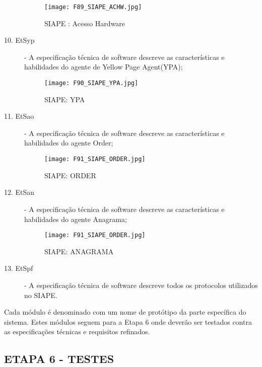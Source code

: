 \begin{description}
		 \begin{figure}[!h]
		 	\centering
		 	\texttt{[image: F89\_SIAPE\_ACHW.jpg]} 
		 	\caption{SIAPE : Acesso Hardware}
		 	\label{F89}
		 \end{figure}
		
		\item[10. EtSyp] - A especificação técnica de software descreve as características e habilidades do agente de Yellow Page Agent(YPA);
		
		 \begin{figure}[!h]
		 	\centering
		 	\texttt{[image: F90\_SIAPE\_YPA.jpg]} 
		 	\caption{SIAPE: YPA}
		 	\label{F90}
		 \end{figure}	
				
		\item[11. EtSao] - A especificação técnica de software descreve as características e habilidades do agente Order;
				
		 \begin{figure}[!h]
		 	\centering
		 	\texttt{[image: F91\_SIAPE\_ORDER.jpg]} 
		 	\caption{SIAPE: ORDER}
		 	\label{F91}
		 \end{figure}			
		
		\item[12. EtSan] - A especificação técnica de software descreve as características e habilidades do agente Anagrama;
		
	 \begin{figure}[!h]
	 	\centering
	 	\texttt{[image: F91\_SIAPE\_ORDER.jpg]} 
	 	\caption{SIAPE: ANAGRAMA}
	 	\label{F92}
	 \end{figure}			
		
		\item[13. EtSpf] - A especificação técnica de software descreve todos os protocolos utilizados no SIAPE.	
	\end{description}


Cada módulo é denominado com um nome de protótipo da parte específica do sistema. Estes módulos seguem para a Etapa 6 onde deverão ser testados contra as especificações técnicas e requisitos refinados.  


\clearpage
\subsection{ETAPA 6 - TESTES}

